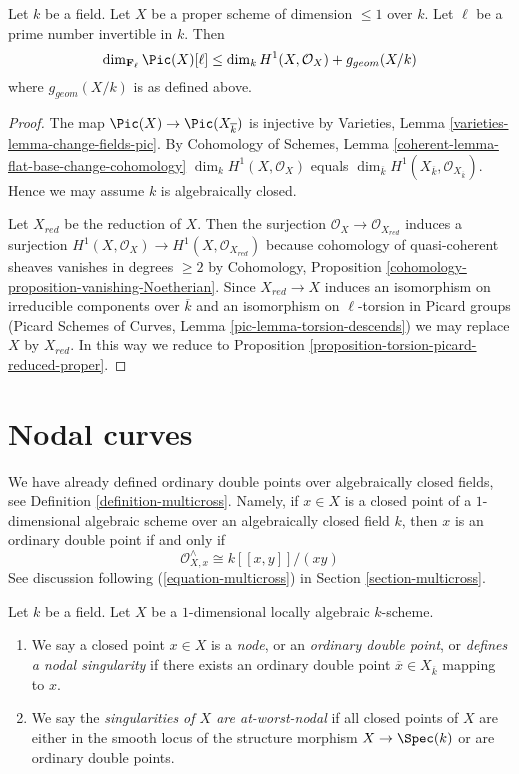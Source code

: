 \begin{lemma}
\label{lemma-bound-torsion-simple}
Let $k$ be a field. Let $X$ be a proper scheme of dimension $\leq 1$ over $k$.
Let $\ell$ be a prime number invertible in $k$. Then
$$
\dim_{\mathbf{F}_\ell} \Pic(X)[\ell] \leq
\dim_k H^1(X, \mathcal{O}_X) + g_{geom}(X/k)
$$
where $g_{geom}(X/k)$ is as defined above.
\end{lemma}

\begin{proof}
The map $\Pic(X) \to \Pic(X_{\overline{k}})$
is injective by Varieties, Lemma \ref{varieties-lemma-change-fields-pic}.
By Cohomology of Schemes, Lemma \ref{coherent-lemma-flat-base-change-cohomology}
$\dim_k H^1(X, \mathcal{O}_X)$ equals
$\dim_{\overline{k}} H^1(X_{\overline{k}}, \mathcal{O}_{X_{\overline{k}}})$.
Hence we may assume $k$ is algebraically closed.

\medskip\noindent
Let $X_{red}$ be the reduction of $X$. Then the surjection
$\mathcal{O}_X \to \mathcal{O}_{X_{red}}$ induces a surjection
$H^1(X, \mathcal{O}_X) \to H^1(X, \mathcal{O}_{X_{red}})$
because cohomology of quasi-coherent sheaves vanishes in degrees
$\geq 2$ by
Cohomology, Proposition \ref{cohomology-proposition-vanishing-Noetherian}.
Since $X_{red} \to X$ induces an isomorphism on irreducible
components over $\overline{k}$ and an isomorphism on
$\ell$-torsion in Picard groups
(Picard Schemes of Curves, Lemma \ref{pic-lemma-torsion-descends})
we may replace $X$ by $X_{red}$. In this way we reduce to
Proposition \ref{proposition-torsion-picard-reduced-proper}.
\end{proof}






\section{Nodal curves}
\label{section-nodal}

\noindent
We have already defined ordinary double points over algebraically
closed fields, see Definition \ref{definition-multicross}. Namely,
if $x \in X$ is a closed point of a $1$-dimensional
algebraic scheme over an algebraically closed field $k$, then
$x$ is an ordinary double point if and only if
$$
\mathcal{O}_{X, x}^\wedge \cong k[[x, y]]/(xy)
$$
See discussion following (\ref{equation-multicross}) in
Section \ref{section-multicross}.

\begin{definition}
\label{definition-nodal}
Let $k$ be a field. Let $X$ be a $1$-dimensional locally algebraic $k$-scheme.
\begin{enumerate}
\item We say a closed point $x \in X$ is a {\it node}, or an
{\it ordinary double point}, or {\it defines a nodal singularity}
if there exists an ordinary double point $\overline{x} \in X_{\overline{k}}$
mapping to $x$.
\item We say the {\it singularities of $X$ are at-worst-nodal} if
all closed points of $X$ are either in the smooth locus of
the structure morphism $X \to \Spec(k)$ or are ordinary double points.
\end{enumerate}
\end{definition}


